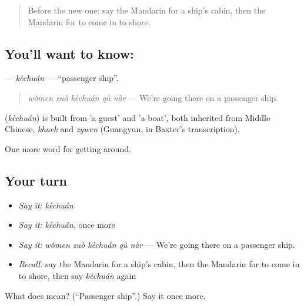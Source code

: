 \label{lesson:ZH-C412-kechuan}



\begin{quote}
Before the new one: say the Mandarin for a ship's cabin, then the Mandarin for to come in to shore.
\end{quote}

\subsection*{You'll want to know: }
\textbf{} — \emph{kèchuán} — \textquotedblleft{}passenger ship\textquotedblright{}.

\begin{quote}
\textbf{} \emph{wǒmen zuò kèchuán qù nàr} — We're going there on a passenger ship.
\end{quote}

\begin{cousinweb}
\textbf{} (\emph{kèchuán}) is built from  'a guest' and  'a boat', both inherited from Middle Chinese, \emph{khaek} and \emph{zywen} (Guangyun, in Baxter's transcription).
\end{cousinweb}

\begin{grammarlens}[title={What you've built}]
One more word for getting around.
\end{grammarlens}

\subsection*{Your turn}
\begin{itemize}
\raggedright
  \item \emph{Say it:} \emph{kèchuán}
  \item \emph{Say it:} \emph{kèchuán}, once more
  \item \emph{Say it:} \emph{wǒmen zuò kèchuán qù nàr} — We're going there on a passenger ship.
  \item \emph{Recall:} say the Mandarin for a ship's cabin, then the Mandarin for to come in to shore, then say \emph{kèchuán} again
\end{itemize}

\begin{tcolorbox}[breakable,colback=teal!4,colframe=teal!35!black,title={Before you move on}]
What does  mean? (\textquotedblleft{}Passenger ship\textquotedblright{}.) Say it once more.
\end{tcolorbox}
